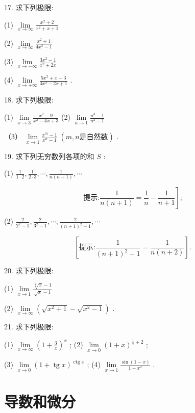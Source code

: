 \documentclass[lang=cn,newtx,12pt,scheme=chinese]{elegantbook}
\begin{document}
17. 求下列极限:

(1) \(\mathop{\lim }\limits_{{x \rightarrow \infty }}\frac{{x}^{2} + 2}{{x}^{2} + x + 1}\)

(2) \(\mathop{\lim }\limits_{{x \rightarrow \infty }}\frac{{x}^{2} + 1}{4{x}^{3} - 1}\)

(3) \(\mathop{\lim }\limits_{{x \rightarrow - \infty }}\frac{3{x}^{2} - 1}{{x}^{2} + {2x}}\)

(4) \(\mathop{\lim }\limits_{{x \rightarrow + \infty }}\frac{5{x}^{2} + x - 3}{4{x}^{2} - {2x} + 1}\) .

18. 求下列极限:

(1) \(\mathop{\lim }\limits_{{x \rightarrow 3}}\frac{{x}^{2} - 9}{{x}^{2} - {4x} + 3}\) (2) \(\mathop{\lim }\limits_{{u \rightarrow 1}}\frac{{u}^{3} - 1}{{u}^{2} - 1}\)

（3） \(\mathop{\lim }\limits_{{x \rightarrow 1}}\frac{{x}^{m} - 1}{{x}^{n} - 1}\;\left( {m,n\text{是自然数}}\right)\) .

19. 求下列无穷数列各项的和 \(S\) :

(1) \(\frac{1}{1 \cdot 2},\frac{1}{2 \cdot 3},\cdots ,\frac{1}{n\left( {n + 1}\right) },\cdots\)

\[
\text{提示:}\left. {\frac{1}{n\left( {n + 1}\right) } = \frac{1}{n} - \frac{1}{n + 1}}\right\rbrack \text{;}
\]

(2) \(\frac{2}{{2}^{2} - 1},\frac{2}{{3}^{2} - 1},\cdots ,\frac{2}{{\left( n + 1\right) }^{2} - 1},\cdots\)

\[
\left\lbrack {\text{提示:}\frac{1}{{\left( n + 1\right) }^{2} - 1} = \frac{1}{n\left( {n + 2}\right) }}\right\rbrack \text{.}
\]

20. 求下列极限:

(1) \(\mathop{\lim }\limits_{{x \rightarrow 1}}\frac{\sqrt[3]{x} - 1}{\sqrt{x} - 1}\)

(2) \(\mathop{\lim }\limits_{{x \rightarrow \infty }}\left( {\sqrt{{x}^{2} + 1} - \sqrt{{x}^{2} - 1}}\right)\) .

21. 求下列极限:

(1) \(\mathop{\lim }\limits_{{x \rightarrow \infty }}{\left( 1 + \frac{3}{x}\right) }^{x}\) ; (2) \(\mathop{\lim }\limits_{{x \rightarrow 0}}{\left( 1 + x\right) }^{\frac{1}{x} + 2}\) ;

(3) \(\mathop{\lim }\limits_{{x \rightarrow 0}}{\left( 1 + \operatorname{tg}x\right) }^{\operatorname{ctg}x}\) ; (4) \(\mathop{\lim }\limits_{{x \rightarrow 1}}\frac{\sin \left( {1 - x}\right) }{1 - {x}^{2}}\) .

\chapter{导数和微分}
\end{document}
